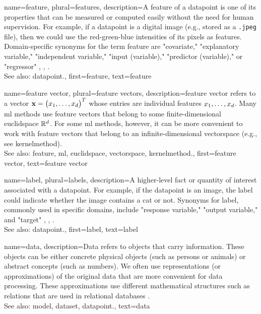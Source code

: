 {name={feature}, plural={features},
	description={A feature of a \gls{datapoint} is one of its properties that can be 
		measured or computed easily without the need for human supervision. For example, if a \gls{datapoint} 
		is a digital image (e.g., stored as a \texttt{.jpeg} file), then we could use the red-green-blue intensities 
		of its pixels as features. Domain-specific synonyms for the term feature are "covariate," "explanatory variable," 
		"independent variable," "input (variable)," "predictor (variable)," or "regressor" \cite{Gujarati2021}, \cite{Dodge2003}, \cite{Everitt2022}. 
				\\
		See also: \gls{datapoint}.}, 
	first={feature},
	text={feature}  
}

{name={feature vector}, plural={feature vectors},
	description={\Gls{feature} vector refers to a vector ${\bf x} = \big(x_{1}, \ldots, x_{d}\big)^{T}$ 
		whose entries are individual \glspl{feature} $x_{1}, \ldots, x_{d}$. Many \gls{ml} methods 
		use \gls{feature} vectors that belong to some finite-dimensional \gls{euclidspace} $\mathbb{R}^{d}$. 
		For some \gls{ml} methods, however, it can be more convenient to work with \gls{feature} 
		vectors that belong to an infinite-dimensional \gls{vectorspace} (e.g., see \gls{kernelmethod}). 
			\\
		See also: \gls{feature}, \gls{ml}, \gls{euclidspace}, \gls{vectorspace}, \gls{kernelmethod}.}, 
	first={feature vector},
	text={feature vector}  
}


{name={label}, plural={labels},
	description={A higher-level fact or quantity of interest associated with a \gls{datapoint}. 
		For example, if the \gls{datapoint} is an image, the label could indicate whether the 
		image contains a cat or not. Synonyms for label, commonly used in specific domains, 
		include "response variable," "output variable," and "target" \cite{Gujarati2021}, \cite{Dodge2003}, \cite{Everitt2022}.
				\\
		See also: \gls{datapoint}.},
	first={label},
	text={label}  
}


{name={data},
	 description={Data refers to objects that carry information. These 
	 	objects can be either concrete physical objects (such as persons or animals) 
	 	or abstract concepts (such as numbers). We often use representations (or 
	 	approximations) of the original data that are more convenient for data processing. 
	 	These approximations use different mathematical structures such as relations 
		that are used in relational databases \cite{silberschatz2019database,codd1970relational}.
				\\
		See also: \gls{model}, \gls{dataset}, \gls{datapoint}.}, 
	text={data}
}

